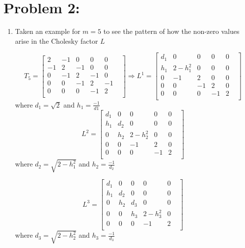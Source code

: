\newpage
\section*{Problem 2:}
\begin{enumerate}
\item Taken an example for $m=5$ to see the pattern of how the non-zero values arise in the Cholesky factor $L$

$$
T_{5} = 
\begin{bmatrix}
2  & -1 & 0  & 0  & 0  &\\
-1 & 2  & -1 & 0  & 0  &\\
0  & -1 & 2  & -1 & 0  &\\
0  & 0  & -1 & 2  & -1 &\\
0  & 0  & 0  & -1 & 2  &\\
\end{bmatrix}
\Longrightarrow 
L^{1} = 
\begin{bmatrix}
d_{1} &  0           & 0  & 0  & 0  &\\
h_{1} & 2-h_{1}^{2}  & 0  & 0  & 0  &\\
0     & -1           & 2  &  0 & 0  &\\
0     & 0            & -1 & 2  & 0 &\\
0     & 0            & 0  & -1 & 2  &\\
\end{bmatrix}
$$
where $d_{1} = \sqrt{2}$ and $h_{1}= \frac{-1}{d1}$
$$
L^{2} = 
\begin{bmatrix}
d_{1} & 0     & 0            & 0  & 0  &\\
h_{1} & d_{2} &  0           & 0  & 0  &\\
0     & h_{2} & 2-h_{2}^{2}  &  0 & 0  &\\
0     & 0     & -1           & 2  &  0 &\\
0     & 0     & 0            & -1 & 2  &\\
\end{bmatrix}
$$
where $d_{2} = \sqrt{2-h_{1}^{2}}$ and $h_{2}= \frac{-1}{d_{2}}$

$$
L^{3} = 
\begin{bmatrix}
d_{1} & 0     & 0      & 0            & 0  &\\
h_{1} & d_{2} & 0      & 0            & 0  &\\
0     & h_{2} & d_{3}  & 0            & 0  &\\
0     & 0     & h_{3}  & 2-h_{3}^{2}  & 0  &\\
0     & 0     & 0      & -1           & 2  &\\
\end{bmatrix}
$$
where $d_{3} = \sqrt{2-h_{2}^{2}}$ and $h_{3}= \frac{-1}{d_{3}}$


\end{enumerate}
